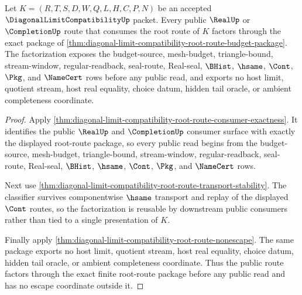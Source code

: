 \begin{theorem}
\label{thm:diagonal-limit-compatibility-root-route-public-factorization}
Let $K=(R,T,S,D,W,Q,L,H,C,P,N)$ be an accepted $\DiagonalLimitCompatibilityUp$ packet. Every public $\RealUp$ or $\CompletionUp$ route that consumes the root route of $K$ factors through the exact package of \autoref{thm:diagonal-limit-compatibility-root-route-budget-package}. The factorization exposes the budget-source, mesh-budget, triangle-bound, stream-window, regular-readback, seal-route, Real-seal, $\BHist$, $\hsame$, $\Cont$, $\Pkg$, and $\NameCert$ rows before any public read, and exports no host limit, quotient stream, host real equality, choice datum, hidden tail oracle, or ambient completeness coordinate.
\end{theorem}
\begin{proof}
Apply \autoref{thm:diagonal-limit-compatibility-root-route-consumer-exactness}. It identifies the public $\RealUp$ and $\CompletionUp$ consumer surface with exactly the displayed root-route package, so every public read begins from the budget-source, mesh-budget, triangle-bound, stream-window, regular-readback, seal-route, Real-seal, $\BHist$, $\hsame$, $\Cont$, $\Pkg$, and $\NameCert$ rows.

Next use \autoref{thm:diagonal-limit-compatibility-root-route-transport-stability}. The classifier survives componentwise $\hsame$ transport and replay of the displayed $\Cont$ routes, so the factorization is reusable by downstream public consumers rather than tied to a single presentation of $K$.

Finally apply \autoref{thm:diagonal-limit-compatibility-root-route-nonescape}. The same package exports no host limit, quotient stream, host real equality, choice datum, hidden tail oracle, or ambient completeness coordinate. Thus the public route factors through the exact finite root-route package before any public read and has no escape coordinate outside it.
\end{proof}

